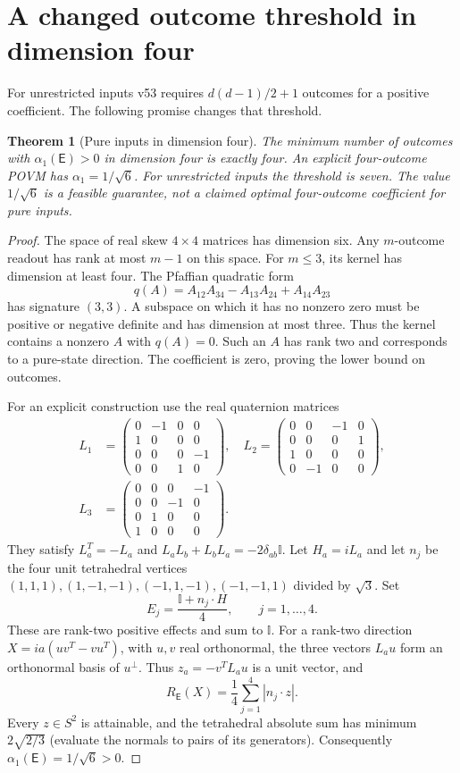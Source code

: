 \documentclass[11pt]{article}
\newtheorem{theorem}{Theorem}
\newcommand{\Id}{\mathbb I}
\newcommand{\E}{\mathsf E}
\begin{document}
\section{A changed outcome threshold in dimension four}
For unrestricted inputs v53 requires $d(d-1)/2+1$ outcomes for a
positive coefficient. The following promise changes that threshold.

\begin{theorem}[Pure inputs in dimension four]
The minimum number of outcomes with $\alpha_1(\E)>0$ in dimension
four is exactly four. An explicit four-outcome POVM has
$\alpha_1=1/\sqrt6$. For unrestricted inputs the threshold is seven.
The value $1/\sqrt6$ is a feasible guarantee, not a claimed optimal
four-outcome coefficient for pure inputs.
\end{theorem}
\begin{proof}
The space of real skew $4\times4$ matrices has dimension six.
Any $m$-outcome readout has rank at most $m-1$ on this space.
For $m\leq3$, its kernel has dimension at least four.
The Pfaffian quadratic form
\[
q(A)=A_{12}A_{34}-A_{13}A_{24}+A_{14}A_{23}
\]
has signature $(3,3)$. A subspace on which it has no nonzero zero
must be positive or negative definite and has dimension at most
three. Thus the kernel contains a nonzero $A$ with $q(A)=0$.
Such an $A$ has rank two and corresponds to a pure-state direction.
The coefficient is zero, proving the lower bound on outcomes.

For an explicit construction use the real quaternion matrices
\[
\begin{split}
L_1&=\begin{pmatrix}0&-1&0&0\\1&0&0&0\\0&0&0&-1\\0&0&1&0\end{pmatrix},\quad
L_2=\begin{pmatrix}0&0&-1&0\\0&0&0&1\\1&0&0&0\\0&-1&0&0\end{pmatrix},\\
L_3&=\begin{pmatrix}0&0&0&-1\\0&0&-1&0\\0&1&0&0\\1&0&0&0\end{pmatrix}.
\end{split}
\]
They satisfy $L_a^T=-L_a$ and
$L_aL_b+L_bL_a=-2\delta_{ab}\Id$.
Let $H_a=iL_a$ and let $n_j$ be the four unit tetrahedral vertices
$(1,1,1),(1,-1,-1),(-1,1,-1),(-1,-1,1)$ divided by $\sqrt3$.
Set
\[
E_j=\frac{\Id+n_j\cdot H}{4},\qquad j=1,\ldots,4.
\]
These are rank-two positive effects and sum to $\Id$.
For a rank-two direction $X=ia(uv^T-vu^T)$, with $u,v$ real
orthonormal, the three vectors $L_a u$ form an orthonormal basis
of $u^\perp$. Thus $z_a=-v^TL_a u$ is a unit vector, and
\[
R_{\E}(X)=\frac14\sum_{j=1}^4|n_j\cdot z|.
\]
Every $z\in S^2$ is attainable, and the tetrahedral absolute sum
has minimum $2\sqrt{2/3}$ (evaluate the normals to pairs of its
generators). Consequently $\alpha_1(\E)=1/\sqrt6>0$.
\end{proof}
\end{document}

